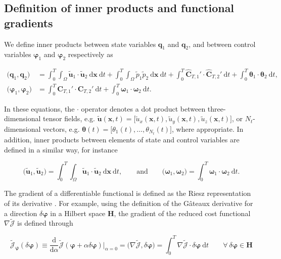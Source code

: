 \documentclass[energies,article,submit,moreauthors,latex,10pt,a4paper]{mdpi}
\newcommand{\bs}[1]{\boldsymbol{#1}}
\newcommand{\dx}{\text{d}\boldsymbol{x}}
\newcommand{\dt}{\text{d}t}
\newcommand{\stint}{\int_{0}^{T} \int_{\Omega}}
\newcommand{\Tint}{\int_{0}^{T}}
\newcommand{\utilde}{\widetilde{\bs{u}}}
\newcommand{\ptilde}{\widetilde{p}}
\newcommand{\Jtilde}{\tilde{\mathscr{J}}}
\begin{document}
\subsection{Definition of inner products and functional gradients}\label{sec:definitions}
\noindent We define inner products between state variables $\bs{q}_1$ and $\bs{q}_2$, and between control variables $\bs{\varphi}_1$ and $\bs{\varphi}_2$ respectively as

\begin{align}
\big( \bs{q}_1, \bs{q}_2 \big) &= \stint \utilde_1 \cdot \utilde_2 ~\dx~\dt + \stint \ptilde_1 \ptilde_2 ~\dx~\dt + \Tint \widehat{\bs{C}}_{T,1}' \cdot \widehat{\bs{C}}_{T,2}' ~\dt+ \Tint \bs{\theta}_1 \cdot \bs{\theta}_2 ~\dt, \\
\big( \bs{\varphi}_1, \bs{\varphi}_2 \big) &= \Tint \bs{C}_{T,1}' \cdot \bs{C}_{T,2}' ~\dt + \Tint \bs{\omega}_1 \cdot \bs{\omega}_2 ~\dt. 
\end{align}

\noindent In these equations, the $\cdot$ operator denotes a dot product between three-dimensional tensor fields, e.g. $\utilde(\bs{x},t) = \big[\widetilde{u}_x(\bs{x},t),\widetilde{u}_y(\bs{x},t),\widetilde{u}_z(\bs{x},t)\big]$, or $N_t$-dimensional vectors, e.g. $\bs{\theta}(t) = \big[\theta_1(t), \dots, \theta_{N_t}(t)\big]$, where appropriate.  In addition, inner products between elements of state and control variables are defined in a similar way, for instance 

\begin{equation}
\big(  \utilde_1, \utilde_2 \big) = \stint \utilde_1 \cdot \utilde_2 ~\dx~\dt, \qquad \text{and} \qquad \big( \bs{\omega}_1 ,\bs{\omega}_2 \big) = \Tint \bs{\omega}_1 \cdot \bs{\omega}_2 ~\dt.
\end{equation}

\noindent The gradient of a differentiable functional is defined as the Riesz representation of its derivative \cite{troltzsch,borzinschulz}. For example, using the definition of the G\^ateaux derivative for a direction $\delta \bs{\varphi}$ in a Hilbert space $\mathscr{\bs{H}}$, the gradient of the reduced cost functional $\nabla \Jtilde$ is defined through

\begin{equation}
\Jtilde_{\bs{\varphi}}(\delta \bs{\varphi}) \equiv \frac{\text{d}}{\text{d}\alpha} \Jtilde (\bs{\varphi}+ \alpha \delta \bs{\varphi}) \bigg\vert_{\alpha=0} = \big( \nabla \Jtilde, \delta \bs{\varphi} \big) = \Tint \nabla \Jtilde \cdot \delta \bs{\varphi} ~\dt \qquad \forall ~\delta \bs{\varphi} \in \mathscr{\bs{H}}
\end{equation}
\end{document}
